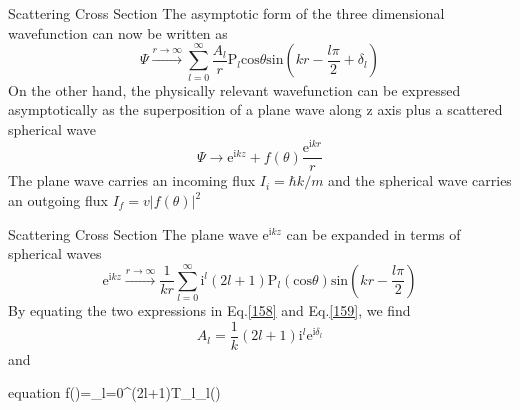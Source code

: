 \documentclass{beamer}
\begin{document}
	\begin{frame}{Scattering Cross Section}
		The asymptotic form of the three dimensional wavefunction can now be written as
		\begin{equation}
			\Psi\stackrel{r\rightarrow\infty}{\longrightarrow}\sum\limits_{l=0}^\infty\dfrac{A_l}{r}\mathrm{P}_l\mathrm{cos}\theta\mathrm{sin}(kr-\dfrac{l\pi}{2}+\delta_l)
			\label{158}
		\end{equation}
		On the other hand, the physically relevant wavefunction can be expressed asymptotically as the superposition of a plane wave along z axis plus a scattered spherical wave
		\begin{equation}
			\Psi\rightarrow\mathrm{e}^{\mathrm{i}kz}+f(\theta)\dfrac{\mathrm{e}^{\mathrm{i}kr}}{r}
			\label{159}
		\end{equation}
		The plane wave carries an incoming flux $I_i=\hbar k/m$ and the spherical wave carries an outgoing flux $I_f=v|f(\theta)|^2$
	\end{frame}
	\begin{frame}{Scattering Cross Section}
		The plane wave $\mathrm{e}^{\mathrm{i}kz}$ can be expanded in terms of spherical waves
		\begin{equation}
			\mathrm{e}^{\mathrm{i}kz}\stackrel{r\rightarrow\infty}{\longrightarrow}\dfrac{1}{kr}\sum\limits_{l=0}^\infty\mathrm{i}^l(2l+1)\mathrm{P}_l(\mathrm{cos}\theta)\mathrm{sin}(kr-\dfrac{l\pi}{2})
		\end{equation}
		By equating the two expressions in Eq.\eqref{158} and Eq.\eqref{159}, we find
		\begin{equation}
			A_l=\dfrac{1}{k}(2l+1)\mathrm{i}^l\mathrm{e}^{\mathrm{i}\delta_l}
		\end{equation}
		and
		\begin{empheq}[box=\fbox]{equation}
			f(\theta)=\sum\limits_{l=0}^\infty(2l+1)T_l_l(\theta)
		\end{empheq}
	\end{frame}
\end{document}
